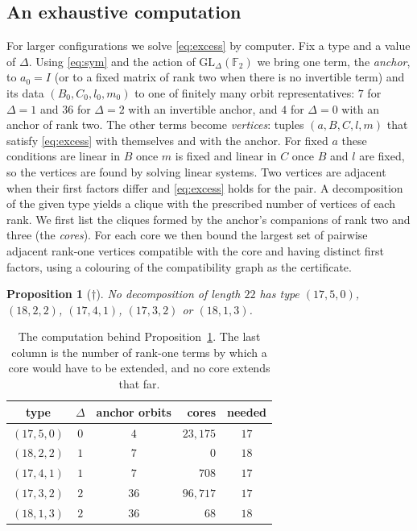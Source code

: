 \documentclass[11pt]{amsart}
\newtheorem{proposition}[theorem]{Proposition}
\theoremstyle{definition}
\theoremstyle{remark}
\numberwithin{equation}{section}
\newcommand{\F}{\mathbb{F}_2}
\begin{document}
\subsection{An exhaustive computation}
For larger configurations we solve \eqref{eq:excess} by computer. Fix a type and a value of $\Delta$. Using \eqref{eq:sym} and the action of $\mathrm{GL}_\Delta(\F)$ we bring one term, the \emph{anchor}, to $a_0=I$ (or to a fixed matrix of rank two when there is no invertible term) and its data $(B_0,C_0,l_0,m_0)$ to one of finitely many orbit representatives: $7$ for $\Delta=1$ and $36$ for $\Delta=2$ with an invertible anchor, and $4$ for $\Delta=0$ with an anchor of rank two. The other terms become \emph{vertices}: tuples $(a,B,C,l,m)$ that satisfy \eqref{eq:excess} with themselves and with the anchor. For fixed $a$ these conditions are linear in $B$ once $m$ is fixed and linear in $C$ once $B$ and $l$ are fixed, so the vertices are found by solving linear systems. Two vertices are adjacent when their first factors differ and \eqref{eq:excess} holds for the pair. A decomposition of the given type yields a clique with the prescribed number of vertices of each rank. We first list the cliques formed by the anchor's companions of rank two and three (the \emph{cores}). For each core we then bound the largest set of pairwise adjacent rank-one vertices compatible with the core and having distinct first factors, using a colouring of the compatibility graph as the certificate.

\begin{proposition}[$\dagger$]\label{prop:types}
No decomposition of length $22$ has type $(17,5,0)$, $(18,2,2)$, $(17,4,1)$, $(17,3,2)$ or $(18,1,3)$.
\end{proposition}

\begin{table}[ht]
\caption{The computation behind Proposition~\ref{prop:types}. The last column is the number of rank-one terms by which a core would have to be extended, and no core extends that far.}\label{tab:types}
\centering
\small
\begin{tabular}{@{}cccrc@{}}
\toprule
type & $\Delta$ & anchor orbits & cores & needed\\
\midrule
$(17,5,0)$ & $0$ & $4$ & $23{,}175$ & $17$\\
$(18,2,2)$ & $1$ & $7$ & $0$ & $18$\\
$(17,4,1)$ & $1$ & $7$ & $708$ & $17$\\
$(17,3,2)$ & $2$ & $36$ & $96{,}717$ & $17$\\
$(18,1,3)$ & $2$ & $36$ & $68$ & $18$\\
\bottomrule
\end{tabular}
\end{table}
\end{document}
